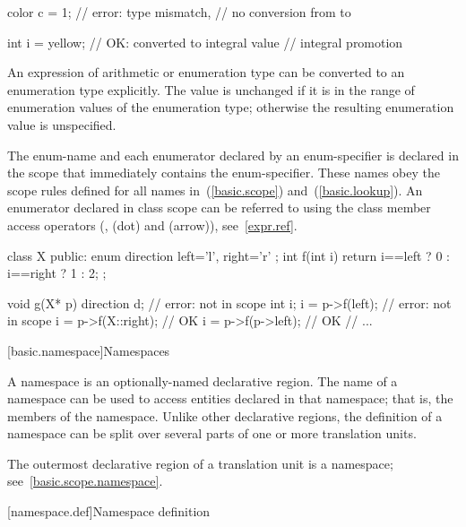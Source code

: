 \begin{codeblock}
color c = 1;                    // error: type mismatch,
                                // no conversion from  to 

int i = yellow;                 // OK:  converted to integral value 
                                // integral promotion
\end{codeblock}

\exitexampleb

\pnum
An expression of arithmetic or enumeration type can be converted to an
enumeration type explicitly. The value is unchanged if it is in the range
of enumeration values of the enumeration type; otherwise the resulting
enumeration value is unspecified.

\pnum
{}%
The enum-name and each enumerator declared by an enum-specifier is declared
in the scope that immediately contains the enum-specifier.
These names obey the scope rules defined for all names
in~(\ref{basic.scope}) and~(\ref{basic.lookup}).
%
An enumerator declared in class scope can be referred to using the class
member access operators (\tcode{::},  (dot) and \tcode{->}
(arrow)), see~\ref{expr.ref}.
\enterexample

\begin{codeblock}
class X {
public:
    enum direction { left='l', right='r' };
    int f(int i)
	{ return i==left ? 0 : i==right ? 1 : 2; }
};

void g(X* p)
{
    direction d;                // error:  not in scope
    int i;
    i = p->f(left);             // error:  not in scope
    i = p->f(X::right);         // OK
    i = p->f(p->left);          // OK
    // ...
}
\end{codeblock}
\exitexampleb

[basic.namespace]{Namespaces}%

\pnum
A namespace is an optionally-named declarative region. The name of a
namespace can be used to access entities declared in that namespace;
that is, the members of the namespace. Unlike other declarative regions,
the definition of a namespace can be split over several parts of one or
more translation units.

\pnum
The outermost declarative region of a translation unit is a namespace;
see~\ref{basic.scope.namespace}.

[namespace.def]{Namespace definition}%
%

